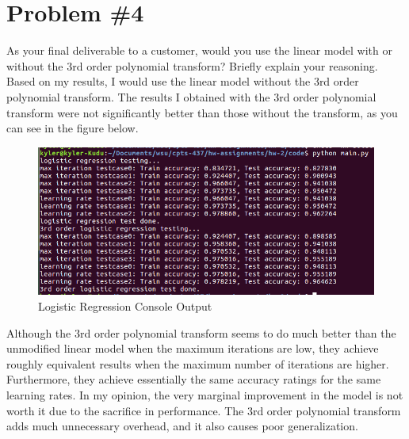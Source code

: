 \documentclass[12pt]{article}
\begin{document}
	\section*{Problem \#4}
	As your final deliverable to a customer, would you use the linear model with or without the 3rd order polynomial transform? Briefly explain your reasoning. \\
	Based on my results, I would use the linear model without the 3rd order polynomial transform. The results I obtained with the 3rd order polynomial transform were not significantly better than those without the transform, as you can see in the figure below.
	\begin{figure}[h]
		\begin{center}
			\includegraphics[width=\linewidth]{hw2_results.png}
			\caption{Logistic Regression Console Output}
			\label{fig:log_reg_results}
		\end{center}
	\end{figure}
	Although the 3rd order polynomial transform seems to do much better than the unmodified linear model when the maximum iterations are low, they achieve roughly equivalent results when the maximum number of iterations are higher. Furthermore, they achieve essentially the same accuracy ratings for the same learning rates. In my opinion, the very marginal improvement in the model is not worth it due to the sacrifice in performance. The 3rd order polynomial transform adds much unnecessary overhead, and it also causes poor generalization.
	
\end{document}
